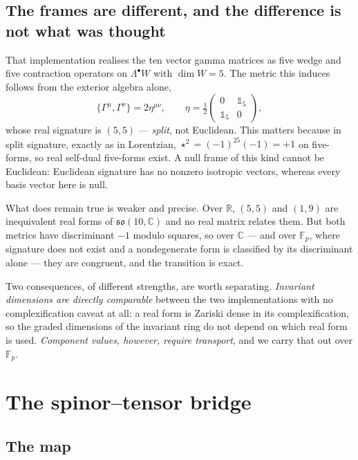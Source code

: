 \documentclass[11pt,a4paper]{article}
\begin{document}
\subsection{The frames are different, and the difference is not what was thought}
\label{sec:signature}

That implementation realises the ten vector gamma matrices as five wedge and five
contraction operators on $\Lambda^\bullet W$ with $\dim W = 5$. The metric this
induces follows from the exterior algebra alone,
\begin{equation}
  \{\Gamma^\mu,\Gamma^\nu\} = 2\eta^{\mu\nu},
  \qquad
  \eta = \tfrac12\begin{pmatrix} 0 & \mathbb{1}_5\\ \mathbb{1}_5 & 0\end{pmatrix},
\end{equation}
whose real signature is $(5,5)$ --- \emph{split}, not Euclidean. This matters
because in split signature, exactly as in Lorentzian,
$\star^2 = (-1)^{25}(-1) = +1$ on five-forms, so real self-dual five-forms exist.
A null frame of this kind cannot be Euclidean: Euclidean signature has no
nonzero isotropic vectors, whereas every basis vector here is null.

What does remain true is weaker and precise. Over $\mathbb{R}$, $(5,5)$ and
$(1,9)$ are inequivalent real forms of $\mathfrak{so}(10,\mathbb{C})$ and no real
matrix relates them. But both metrics have discriminant $-1$ modulo squares, so
over $\mathbb{C}$ --- and over $\mathbb{F}_p$, where signature does not exist and
a nondegenerate form is classified by its discriminant alone --- they are
congruent, and the transition is exact.

Two consequences, of different strengths, are worth separating.
\emph{Invariant dimensions are directly comparable} between the two
implementations with no complexification caveat at all: a real form is Zariski
dense in its complexification, so the graded dimensions of the invariant ring do
not depend on which real form is used. \emph{Component values, however, require
transport}, and we carry that out over $\mathbb{F}_p$.

\section{The spinor--tensor bridge}
\label{sec:bridge}

\subsection{The map}
\end{document}
